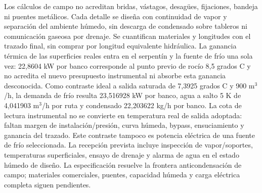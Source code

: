 Los cálculos de campo no acreditan bridas, vástagos, desagües, fijaciones, bandeja ni puentes metálicos. Cada detalle se diseña con continuidad de vapor y separación del ambiente húmedo, sin descarga de condensado sobre tableros ni comunicación gaseosa por drenaje. Se cuantifican materiales y longitudes con el trazado final, sin comprar por longitud equivalente hidráulica. La ganancia térmica de las superficies reales entra en el serpentín y la fuente de frío una sola vez: 22,8604 kW por banco corresponde al punto previo de rocío 8,5 grados C y no acredita el nuevo presupuesto instrumental ni absorbe esta ganancia desconocida. Como contraste ideal a salida saturada de 7,3925 grados C y 900 m$^3$/h, la demanda de frío resulta 23,516928 kW por banco, agua a salto 5 K de 4,041903 m$^3$/h por ruta y condensado 22,203622 kg/h por banco. La cota de lectura instrumental no se convierte en temperatura real de salida adoptada: faltan margen de instalación/presión, curva húmeda, bypass, ensuciamiento y ganancia del trazado. Este contraste tampoco es potencia eléctrica de una fuente de frío seleccionada. La recepción prevista incluye inspección de vapor/soportes, temperaturas superficiales, ensayo de drenaje y alarma de agua en el estado húmedo de diseño. La especificación resuelve la frontera anticondensación de campo; materiales comerciales, puentes, capacidad húmeda y carga eléctrica completa siguen pendientes.
